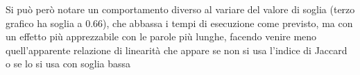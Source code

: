 \documentclass{article}
\begin{document}
Si può però notare un comportamento diverso al variare del valore di soglia (terzo grafico ha soglia a 0.66), che abbassa i tempi di esecuzione come previsto, ma con un effetto più apprezzabile con le parole più lunghe, facendo venire meno quell'apparente relazione di linearità che appare se non si usa l'indice di Jaccard o se lo si usa con soglia bassa
	
\end{document}
